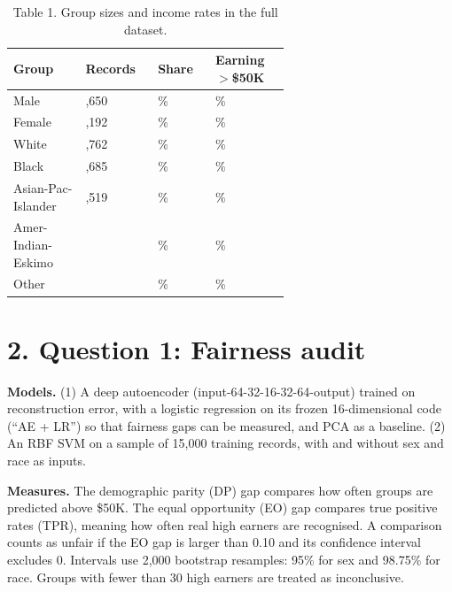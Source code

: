 \documentclass[10pt,a4paper]{article}
\begin{document}
\begin{table}[H]
\centering\scriptsize
\setlength{\tabcolsep}{3pt}
\begin{tabular}{@{}>{\raggedright\arraybackslash}p{0.209\linewidth}>{\raggedright\arraybackslash}p{0.124\linewidth}>{\raggedright\arraybackslash}p{0.124\linewidth}>{\raggedright\arraybackslash}p{0.162\linewidth}@{}}
\toprule
\textbf{Group} & \textbf{Records} & \textbf{Share} & \textbf{Earning $>$\$50K} \\
\midrule
Male & 32,650 & 66.8\% & 30.4\% \\
Female & 16,192 & 33.2\% & 10.9\% \\
White & 41,762 & 85.5\% & 25.4\% \\
Black & 4,685 & 9.6\% & 12.1\% \\
Asian-Pac-Islander & 1,519 & 3.1\% & 26.9\% \\
Amer-Indian-Eskimo & 470 & 1.0\% & 11.7\% \\
Other & 406 & 0.8\% & 12.3\% \\
\bottomrule
\end{tabular}
\caption*{Table 1. Group sizes and income rates in the full dataset.}
\end{table}

\section*{2. Question 1: Fairness audit}

\noindent{}

\textbf{Models.} (1) A deep autoencoder (input-64-32-16-32-64-output) trained on reconstruction error, with a logistic regression on its frozen 16-dimensional code (``AE + LR'') so that fairness gaps can be measured, and PCA as a baseline. (2) An RBF SVM on a sample of 15,000 training records, with and without sex and race as inputs.

\textbf{Measures.} The demographic parity (DP) gap compares how often groups are predicted above \$50K. The equal opportunity (EO) gap compares true positive rates (TPR), meaning how often real high earners are recognised. A comparison counts as unfair if the EO gap is larger than 0.10 and its confidence interval excludes 0. Intervals use 2,000 bootstrap resamples: 95\% for sex and 98.75\% for race. Groups with fewer than 30 high earners are treated as inconclusive.
\end{document}
